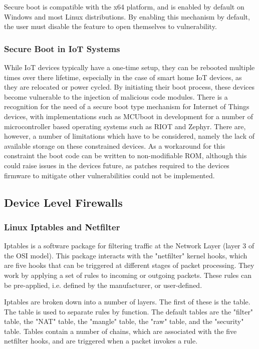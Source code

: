 Secure boot is compatible with the x64 platform, and is enabled by default on
Windows and most Linux distributions\cite{hoffman_2017}. By enabling this
mechanism by default, the user must disable the feature to open themselves to
vulnerability.

\subsubsection{Secure Boot in IoT Systems}

While IoT devices typically have a one-time setup, they can be rebooted multiple
times over there lifetime, especially in the case of smart home IoT devices, as
they are relocated or power cycled. By initiating their boot process, these
devices become vulnerable to the injection of malicious code modules. There is a
recognition for the need of a secure boot type mechanism for Internet of Things
devices, with implementations such as MCUboot in development for a number of
microcontroller based operating systems such as RIOT and
Zephyr\cite{juullabs-oss}. There are, however, a number of limitations which
have to be considered, namely the lack of available storage on these constrained
devices. As a workaround for this constraint the boot code can be written to
non-modifiable ROM, although this could raise issues in the devices future, as
patches required to the devices firmware to mitigate other vulnerabilities could
not be implemented\cite{iotSecurityFoundation}.

\subsection{Device Level Firewalls}

\subsubsection{Linux Iptables and Netfilter}

Iptables is a software package for filtering traffic at the Network Layer
(layer 3 of the OSI model). This package interacts with the "netfilter" kernel
hooks, which are five hooks that can be triggered at different stages of packet
processing. They work by applying a set of rules to incoming or outgoing packets.
These rules can be pre-applied, i.e. defined by the manufacturer, or user-defined.

Iptables are broken down into a number of layers. The first of these is the
table. The table is used to separate rules by function. The default tables are
the "filter" table, the "NAT" table, the "mangle" table, the "raw" table, and
the "security" table. Tables contain a number of chains, which are associated
with the five netfilter hooks, and are triggered when a packet invokes a rule.

